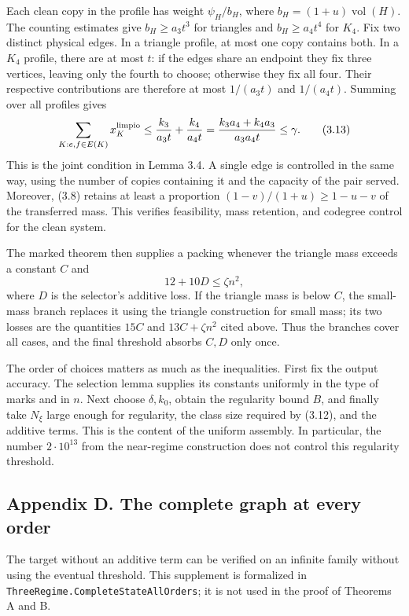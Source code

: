 \documentclass[english,11pt,a4paper]{article}
\begin{document}
Each clean copy in the profile has weight \(\psi_H/b_H\), where \(b_H=(1+u)\operatorname{vol}(H)\). The counting estimates give \(b_H\ge a_3t^3\) for triangles and \(b_H\ge a_4t^4\) for \(K_4\). Fix two distinct physical edges. In a triangle profile, at most one copy contains both. In a \(K_4\) profile, there are at most \(t\): if the edges share an endpoint they fix three vertices, leaving only the fourth to choose; otherwise they fix all four. Their respective contributions are therefore at most \(1/(a_3t)\) and \(1/(a_4t)\). Summing over all profiles gives \[
\sum_{K:e,f\in E(K)}x_K^{\rm limpio}
\le\frac{k_3}{a_3t}+\frac{k_4}{a_4t}
=\frac{k_3a_4+k_4a_3}{a_3a_4t}\le\gamma.
\tag{3.13}
\] This is the joint condition in Lemma 3.4. A single edge is controlled in the same way, using the number of copies containing it and the capacity of the pair served. Moreover, (3.8) retains at least a proportion \((1-v)/(1+u)\ge1-u-v\) of the transferred mass. This verifies feasibility, mass retention, and codegree control for the clean system.

The marked theorem then supplies a packing whenever the triangle mass exceeds a constant \(C\) and \[
12+10D\le\zeta n^2,
\tag{3.14}
\] where \(D\) is the selector's additive loss. If the triangle mass is below \(C\), the small-mass branch replaces it using the triangle construction for small mass; its two losses are the quantities \(15C\) and \(13C+\zeta n^2\) cited above. Thus the branches cover all cases, and the final threshold absorbs \(C,D\) only once.

The order of choices matters as much as the inequalities. First fix the output accuracy. The selection lemma supplies its constants uniformly in the type of marks and in \(n\). Next choose \(\delta,k_0\), obtain the regularity bound \(B\), and finally take \(N_\xi\) large enough for regularity, the class size required by (3.12), and the additive terms. This is the content of the uniform assembly. In particular, the number \(2\cdot10^{13}\) from the near-regime construction does not control this regularity threshold.

\subsection{Appendix D. The complete graph at every order}\label{appendix-d.-the-complete-graph-at-every-order}

The target without an additive term can be verified on an infinite family without using the eventual threshold. This supplement is formalized in \nolinkurl{ThreeRegime.CompleteStateAllOrders}; it is not used in the proof of Theorems A and B.
\end{document}
